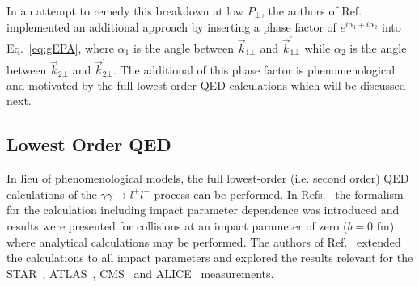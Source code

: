 \documentclass[twocolumn,epjc3]{svjour3}\sloppy
\begin{document}
In an attempt to remedy this breakdown at low $P_\perp$, the authors of Ref.~\cite{zhaInitialTransversemomentumBroadening2020b} implemented an additional approach by inserting a phase factor of $e^{i\alpha_1 + i\alpha_2}$ into Eq.~\ref{eq:gEPA}, where $\alpha_1$ is the angle between $\vec{k}_{1\bot}$ and $\vec{k}^{\prime}_{1\bot}$ while $\alpha_2$ is the angle between $\vec{k}_{2\bot}$ and $\vec{k}^{\prime}_{2\bot}$.
The additional of this phase factor is phenomenological and motivated by the full lowest-order QED calculations which will be discussed next.


\subsection{Lowest Order QED}
\label{sec:qed}
In lieu of phenomenological models, the full lowest-order (i.e. second order) QED calculations of the $\gamma\gamma \rightarrow l^+l^-$ process can be performed. 
In Refs.~\cite{PhysRevA.51.1874,PhysRevA.55.396} the formalism for the calculation including impact parameter dependence was introduced and results were presented for collisions at an impact parameter of zero ($b=0$ fm) where analytical calculations may be performed. The authors of Ref.~\cite{zhaInitialTransversemomentumBroadening2020b,brandenburgAcoplanarityQEDPairs2020b} extended the calculations to all impact parameters and explored the results relevant for the STAR~\cite{starcollaborationMeasurementMomentumAngular2021,starcollaborationLowEnsuremathPair2018b}, ATLAS~\cite{atlascollaborationObservationCentralityDependentAcoplanarity2018a}, CMS~\cite{cmscollaborationObservationForwardNeutron2020a} and ALICE~\cite{alicecollaborationMeasurementExcessYield2016b} measurements. 
\end{document}
